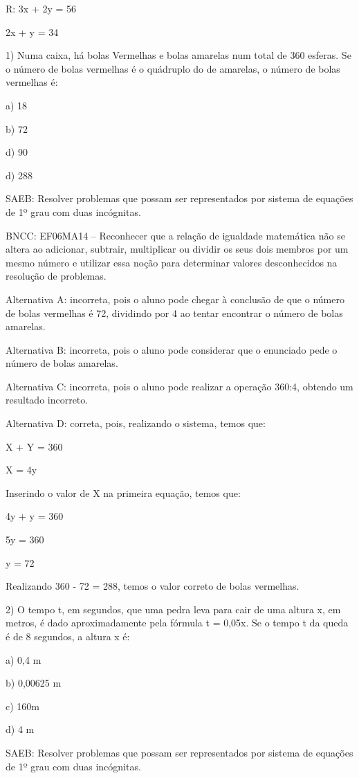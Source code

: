 R: 3x + 2y = 56

2x + y = 34


1) Numa caixa, há bolas Vermelhas e bolas amarelas num total de 360
esferas. Se o número de bolas vermelhas é o quádruplo do de amarelas, o
número de bolas vermelhas é:

a) 18

b) 72

d) 90

d) 288

SAEB: Resolver problemas que possam ser representados por sistema de
equações de 1º grau com duas incógnitas.

BNCC: EF06MA14 -- Reconhecer que a relação de igualdade matemática não
se altera ao adicionar, subtrair, multiplicar ou dividir os seus dois
membros por um mesmo número e utilizar essa noção para determinar
valores desconhecidos na resolução de problemas.

Alternativa A: incorreta, pois o aluno pode chegar à conclusão de que o
número de bolas vermelhas é 72, dividindo por 4 ao tentar encontrar o
número de bolas amarelas.

Alternativa B: incorreta, pois o aluno pode considerar que o enunciado
pede o número de bolas amarelas.

Alternativa C: incorreta, pois o aluno pode realizar a operação 360:4,
obtendo um resultado incorreto.

Alternativa D: correta, pois, realizando o sistema, temos que:

X + Y = 360

X = 4y

Inserindo o valor de X na primeira equação, temos que:

4y + y = 360

5y = 360

y = 72

Realizando 360 - 72 = 288, temos o valor correto de bolas vermelhas.

2) O tempo t, em segundos, que uma pedra leva para cair de uma altura x,
em metros, é dado aproximadamente pela fórmula t = 0,05x. Se o tempo t
da queda é de 8 segundos, a altura x é:

a) 0,4 m

b) 0,00625 m

c) 160m

d) 4 m

SAEB: Resolver problemas que possam ser representados por sistema de
equações de 1º grau com duas incógnitas.

